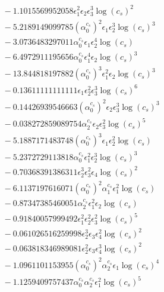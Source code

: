 \documentclass[10pt]{article}
\begin{document}
\begin{align*}
&{}  - 1.1015569952058 \epsilon_{1}^{2} \epsilon_{2} \epsilon_{3}^{3} \log{\left(c_{s} \right)}^{2} \\
&{}  - 5.2189149099785 \left(\alpha_{0}^{c_s}\right)^{2} \epsilon_{1} \epsilon_{2}^{3} \log{\left(c_{s} \right)}^{3} \\
&{}  - 3.0736483297011 \alpha_{0}^{c_s} \epsilon_{1} \epsilon_{2}^{4} \log{\left(c_{s} \right)} \\
&{}  - 6.4972911195656 \alpha_{0}^{c_s} \epsilon_{1}^{4} \epsilon_{2} \log{\left(c_{s} \right)}^{3} \\
&{}  - 13.844818197882 \left(\alpha_{0}^{c_s}\right)^{3} \epsilon_{1}^{2} \epsilon_{2} \log{\left(c_{s} \right)}^{3} \\
&{}  - 0.13611111111111 \epsilon_{1} \epsilon_{2}^{2} \epsilon_{3}^{3} \log{\left(c_{s} \right)}^{6} \\
&{}  - 0.14426939546663 \left(\alpha_{0}^{c_s}\right)^{2} \epsilon_{2} \epsilon_{3}^{3} \log{\left(c_{s} \right)}^{3} \\
&{}  - 0.038272859089754 \alpha_{2}^{c_s} \epsilon_{2} \epsilon_{3}^{2} \log{\left(c_{s} \right)}^{5} \\
&{}  - 5.1887171483748 \left(\alpha_{0}^{c_s}\right)^{3} \epsilon_{1} \epsilon_{2}^{2} \log{\left(c_{s} \right)} \\
&{}  - 5.2372729113818 \alpha_{0}^{c_s} \epsilon_{1}^{2} \epsilon_{2}^{3} \log{\left(c_{s} \right)}^{3} \\
&{}  - 0.70368391386311 \epsilon_{2}^{3} \epsilon_{3}^{2} \epsilon_{4} \log{\left(c_{s} \right)}^{2} \\
&{}  - 6.1137197616071 \left(\alpha_{0}^{c_s}\right)^{2} \alpha_{1}^{c_s} \epsilon_{1}^{2} \log{\left(c_{s} \right)} \\
&{}  - 0.87347385460051 \alpha_{2}^{c_s} \epsilon_{1}^{2} \epsilon_{2} \log{\left(c_{s} \right)} \\
&{}  - 0.91840057999492 \epsilon_{1}^{2} \epsilon_{2}^{2} \epsilon_{3}^{2} \log{\left(c_{s} \right)}^{5} \\
&{}  - 0.061026516259998 \epsilon_{2}^{3} \epsilon_{3} \epsilon_{4}^{2} \log{\left(c_{s} \right)}^{2} \\
&{}  - 0.063818346989081 \epsilon_{2}^{2} \epsilon_{3} \epsilon_{4}^{3} \log{\left(c_{s} \right)}^{2} \\
&{}  - 1.0961101153955 \left(\alpha_{0}^{c_s}\right)^{2} \alpha_{2}^{c_s} \epsilon_{1} \log{\left(c_{s} \right)}^{4} \\
&{}  - 1.1259409757437 \alpha_{0}^{c_s} \alpha_{2}^{c_s} \epsilon_{1}^{2} \log{\left(c_{s} \right)}^{5} \\

\end{align*}
\end{document}
